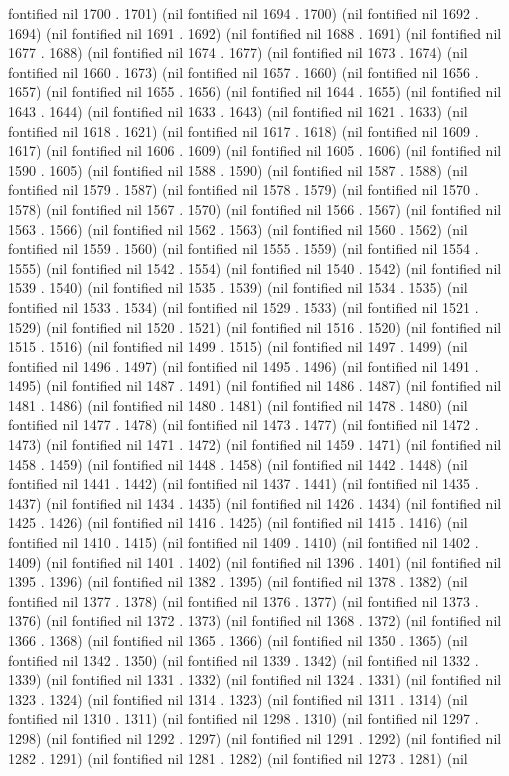 fontified nil 1700 . 1701) (nil fontified nil 1694 . 1700) (nil fontified nil 1692 . 1694) (nil fontified nil 1691 . 1692) (nil fontified nil 1688 . 1691) (nil fontified nil 1677 . 1688) (nil fontified nil 1674 . 1677) (nil fontified nil 1673 . 1674) (nil fontified nil 1660 . 1673) (nil fontified nil 1657 . 1660) (nil fontified nil 1656 . 1657) (nil fontified nil 1655 . 1656) (nil fontified nil 1644 . 1655) (nil fontified nil 1643 . 1644) (nil fontified nil 1633 . 1643) (nil fontified nil 1621 . 1633) (nil fontified nil 1618 . 1621) (nil fontified nil 1617 . 1618) (nil fontified nil 1609 . 1617) (nil fontified nil 1606 . 1609) (nil fontified nil 1605 . 1606) (nil fontified nil 1590 . 1605) (nil fontified nil 1588 . 1590) (nil fontified nil 1587 . 1588) (nil fontified nil 1579 . 1587) (nil fontified nil 1578 . 1579) (nil fontified nil 1570 . 1578) (nil fontified nil 1567 . 1570) (nil fontified nil 1566 . 1567) (nil fontified nil 1563 . 1566) (nil fontified nil 1562 . 1563) (nil fontified nil 1560 . 1562) (nil fontified nil 1559 . 1560) (nil fontified nil 1555 . 1559) (nil fontified nil 1554 . 1555) (nil fontified nil 1542 . 1554) (nil fontified nil 1540 . 1542) (nil fontified nil 1539 . 1540) (nil fontified nil 1535 . 1539) (nil fontified nil 1534 . 1535) (nil fontified nil 1533 . 1534) (nil fontified nil 1529 . 1533) (nil fontified nil 1521 . 1529) (nil fontified nil 1520 . 1521) (nil fontified nil 1516 . 1520) (nil fontified nil 1515 . 1516) (nil fontified nil 1499 . 1515) (nil fontified nil 1497 . 1499) (nil fontified nil 1496 . 1497) (nil fontified nil 1495 . 1496) (nil fontified nil 1491 . 1495) (nil fontified nil 1487 . 1491) (nil fontified nil 1486 . 1487) (nil fontified nil 1481 . 1486) (nil fontified nil 1480 . 1481) (nil fontified nil 1478 . 1480) (nil fontified nil 1477 . 1478) (nil fontified nil 1473 . 1477) (nil fontified nil 1472 . 1473) (nil fontified nil 1471 . 1472) (nil fontified nil 1459 . 1471) (nil fontified nil 1458 . 1459) (nil fontified nil 1448 . 1458) (nil fontified nil 1442 . 1448) (nil fontified nil 1441 . 1442) (nil fontified nil 1437 . 1441) (nil fontified nil 1435 . 1437) (nil fontified nil 1434 . 1435) (nil fontified nil 1426 . 1434) (nil fontified nil 1425 . 1426) (nil fontified nil 1416 . 1425) (nil fontified nil 1415 . 1416) (nil fontified nil 1410 . 1415) (nil fontified nil 1409 . 1410) (nil fontified nil 1402 . 1409) (nil fontified nil 1401 . 1402) (nil fontified nil 1396 . 1401) (nil fontified nil 1395 . 1396) (nil fontified nil 1382 . 1395) (nil fontified nil 1378 . 1382) (nil fontified nil 1377 . 1378) (nil fontified nil 1376 . 1377) (nil fontified nil 1373 . 1376) (nil fontified nil 1372 . 1373) (nil fontified nil 1368 . 1372) (nil fontified nil 1366 . 1368) (nil fontified nil 1365 . 1366) (nil fontified nil 1350 . 1365) (nil fontified nil 1342 . 1350) (nil fontified nil 1339 . 1342) (nil fontified nil 1332 . 1339) (nil fontified nil 1331 . 1332) (nil fontified nil 1324 . 1331) (nil fontified nil 1323 . 1324) (nil fontified nil 1314 . 1323) (nil fontified nil 1311 . 1314) (nil fontified nil 1310 . 1311) (nil fontified nil 1298 . 1310) (nil fontified nil 1297 . 1298) (nil fontified nil 1292 . 1297) (nil fontified nil 1291 . 1292) (nil fontified nil 1282 . 1291) (nil fontified nil 1281 . 1282) (nil fontified nil 1273 . 1281) (nil 